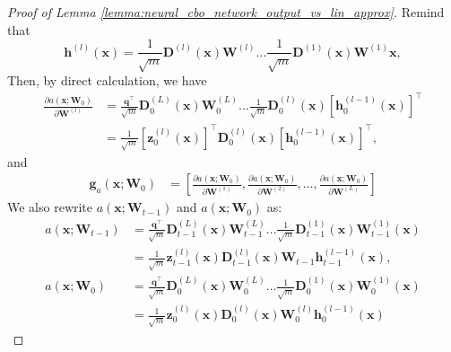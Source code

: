 \begin{proof}[Proof of Lemma \ref{lemma:neural_cbo_network_output_vs_lin_approx}]
Remind that 
\begin{equation*}
    \mathbf{h}^{(l)}(\mathbf{x}) = \frac{1}{\sqrt{m}} \mathbf{D}^{(l)}(\mathbf{x}) \mathbf{W}^{(l)} \dots \frac{1}{\sqrt{m}} \mathbf{D}^{(1)}(\mathbf{x}) \mathbf{W}^{(1)} \mathbf{x},
\end{equation*}
Then, by direct calculation, we have
\begin{align*}
 \frac{\partial a(\mathbf{x}; \mathbf{W}_0)}{\partial \mathbf{W}^{(l)}}  &= \frac{\mathbf{q}^\top}{\sqrt{m}} \mathbf{D}_0^{(L)}(\mathbf{x}) \mathbf{W}_0^{(L)} \dots \frac{1}{\sqrt{m}} \mathbf{D}_0^{(l)}(\mathbf{x}) \left[\mathbf{h}_0^{(l-1)}(\mathbf{x}) \right] ^\top
 \\
 &= \frac{1}{\sqrt{m}} [\mathbf{z}_0^{(l)}(\mathbf{x})]^\top \mathbf{D}_0^{(l)}(\mathbf{x})\left[\mathbf{h}_0^{(l-1)}(\mathbf{x}) \right] ^\top,
\end{align*}
and 
\begin{align*}
    \mathbf{g}_{a}(\mathbf{x}; \mathbf{W}_0) &= \left [ \frac{\partial a(\mathbf{x}; \mathbf{W}_0)}{\partial \mathbf{W}^{(1)}}, \frac{\partial a(\mathbf{x}; \mathbf{W}_0)}{\partial \mathbf{W}^{(2)}}, \dots, \frac{\partial a(\mathbf{x}; \mathbf{W}_0)}{\partial \mathbf{W}^{(L)}} \right]
\end{align*}
We also rewrite $a(\mathbf{x}; \mathbf{W}_{t-1})$ and $a(\mathbf{x}; \mathbf{W}_{0})$  as:
\begin{align*}
    a(\mathbf{x}; \mathbf{W}_{t-1}) &= \frac{\mathbf{q}^\top}{\sqrt{m}} \mathbf{D}_{t-1}^{(L)}(\mathbf{x}) \mathbf{W}_{t-1}^{(L)} \dots \frac{1}{\sqrt{m}} \mathbf{D}_{t-1}^{(1)}(\mathbf{x}) \mathbf{W}_{t-1}^{(1)} (\mathbf{x}) 
    \\
    & = \frac{1}{\sqrt{m}} \mathbf{z}_{t-1}^{(l)} (\mathbf{x}) \mathbf{D}_{t-1}^{(l)} (\mathbf{x}) \mathbf{W}_{t-1}  \mathbf{h}_{t-1}^{(l-1)} (\mathbf{x}),
    \\
    a(\mathbf{x}; \mathbf{W}_{0}) &= \frac{\mathbf{q}^\top}{\sqrt{m}} \mathbf{D}_{0}^{(L)}(\mathbf{x}) \mathbf{W}_{0}^{(L)} \dots \frac{1}{\sqrt{m}} \mathbf{D}_{0}^{(1)}(\mathbf{x}) \mathbf{W}_{0}^{(1)} (\mathbf{x})
    \\
    & = \frac{1}{\sqrt{m}} \mathbf{z}_{0}^{(l)} (\mathbf{x}) \mathbf{D}_{0}^{(l)} (\mathbf{x}) \mathbf{W}_{0}^{(l)}  \mathbf{h}_{0}^{(l-1)} (\mathbf{x})
\end{align*} 


\end{proof}
